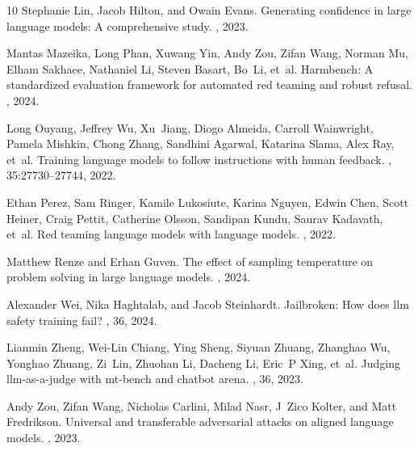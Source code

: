 \documentclass[11pt]{article}
\begin{document}
\begin{thebibliography}{10}
Stephanie Lin, Jacob Hilton, and Owain Evans.
\newblock Generating confidence in large language models: A comprehensive
  study.
, 2023.

Mantas Mazeika, Long Phan, Xuwang Yin, Andy Zou, Zifan Wang, Norman Mu, Elham
  Sakhaee, Nathaniel Li, Steven Basart, Bo~Li, et~al.
\newblock Harmbench: A standardized evaluation framework for automated red
  teaming and robust refusal.
, 2024.

Long Ouyang, Jeffrey Wu, Xu~Jiang, Diogo Almeida, Carroll Wainwright, Pamela
  Mishkin, Chong Zhang, Sandhini Agarwal, Katarina Slama, Alex Ray, et~al.
\newblock Training language models to follow instructions with human feedback.
,
  35:27730--27744, 2022.

Ethan Perez, Sam Ringer, Kamile Lukosiute, Karina Nguyen, Edwin Chen, Scott
  Heiner, Craig Pettit, Catherine Olsson, Sandipan Kundu, Saurav Kadavath,
  et~al.
\newblock Red teaming language models with language models.
, 2022.

Matthew Renze and Erhan Guven.
\newblock The effect of sampling temperature on problem solving in large
  language models.
, 2024.

Alexander Wei, Nika Haghtalab, and Jacob Steinhardt.
\newblock Jailbroken: How does llm safety training fail?
, 36, 2024.

Lianmin Zheng, Wei-Lin Chiang, Ying Sheng, Siyuan Zhuang, Zhanghao Wu, Yonghao
  Zhuang, Zi~Lin, Zhuohan Li, Dacheng Li, Eric~P Xing, et~al.
\newblock Judging llm-as-a-judge with mt-bench and chatbot arena.
, 36, 2023.

Andy Zou, Zifan Wang, Nicholas Carlini, Milad Nasr, J~Zico Kolter, and Matt
  Fredrikson.
\newblock Universal and transferable adversarial attacks on aligned language
  models.
, 2023.

\end{thebibliography}
\end{document}
